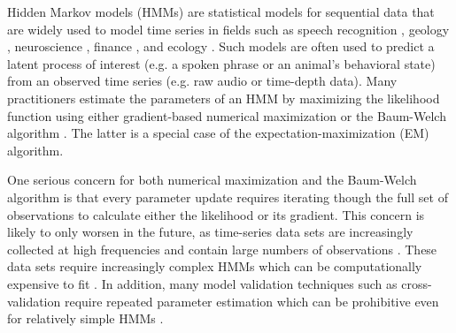 

Hidden Markov models (HMMs) are statistical models for sequential data that are widely used to model time series in fields such as speech recognition \citep{Gales:2008}, geology \citep{Bebbington:2007}, neuroscience \citep{Kottaram:2019}, finance \citep{Mamon:2007}, and ecology \citep{McClintock:2020}. Such models are often used to predict a latent process of interest (e.g. a spoken phrase or an animal's behavioral state) from an observed time series (e.g. raw audio or time-depth data). %
Many practitioners estimate the parameters of an HMM by maximizing the likelihood function using either gradient-based numerical maximization or the Baum-Welch algorithm \citep{Baum:1970}. The latter is a special case of the expectation-maximization (EM) algorithm. 

One serious concern for both numerical maximization and the Baum-Welch algorithm is that every parameter update requires iterating though the full set of observations to calculate either the likelihood or its gradient. This concern is likely to only worsen in the future, as time-series data sets are increasingly collected at high frequencies and contain large numbers of observations \citep{Patterson:2017,Li:2020}. These data sets require increasingly complex HMMs which can be computationally expensive to fit \citep{Adam:2019,Sidrow:2021}. In addition, many model validation techniques such as cross-validation require repeated parameter estimation which can be prohibitive even for relatively simple HMMs \citep{Pohle:2017}.

